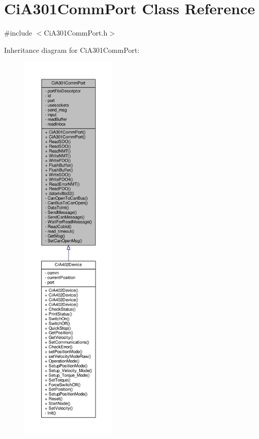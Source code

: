 \hypertarget{classCiA301CommPort}{}\section{Ci\+A301\+Comm\+Port Class Reference}
\label{classCiA301CommPort}


{\ttfamily \#include $<$Ci\+A301\+Comm\+Port.\+h$>$}



Inheritance diagram for Ci\+A301\+Comm\+Port\+:\nopagebreak
\begin{figure}[H]
\begin{center}
\leavevmode
\includegraphics[height=550pt]{classCiA301CommPort__inherit__graph}
\end{center}
\end{figure}


